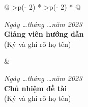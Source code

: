 \documentclass[letterpaper]{article}
\begin{document}
\printbibliography[heading=bibintoc, title={B4. Tài liệu tham
khảo}]



\centering
\begin{longtable}[c]{@{}
  >{\centering\arraybackslash}p{(\columnwidth - 2\tabcolsep) * }
  >{\centering\arraybackslash}p{(\columnwidth - 2\tabcolsep) * }@{}}
    \begin{minipage}[b]{\linewidth}\centering
        \emph{Ngày \ldots tháng \ldots năm 2023}\\
        \textbf{Giảng viên hướng dẫn}\\
        (Ký và ghi rõ họ tên)
    \end{minipage} & 
    \begin{minipage}[b]{\linewidth}\centering
        \emph{Ngày \ldots tháng \ldots năm 2023}\\
        \textbf{Chủ nhiệm đề tài}\\
        (Ký và ghi rõ họ tên)
    \end{minipage} \\
\end{longtable}
\end{document}
